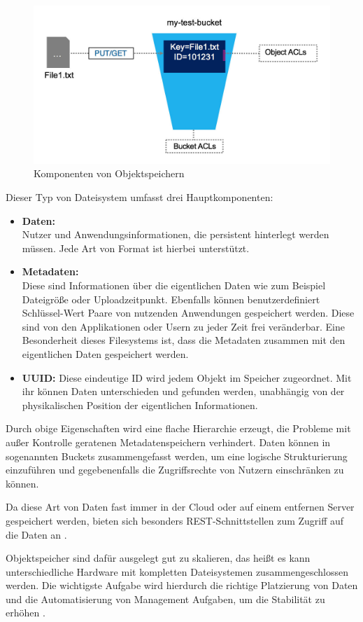\begin{figure}[hbt]
	\centering
	\includegraphics[scale=0.4]{images/object-storage}
	\caption{Komponenten von Objektspeichern \parencite[S. 5]{Rios.2017}}
	\label{fig:objectstorage}
\end{figure}

Dieser Typ von Dateisystem umfasst drei Hauptkomponenten:

\begin{itemize}
	\item \textbf{Daten:}\\
	 Nutzer und Anwendungsinformationen, die persistent hinterlegt werden müssen. Jede Art von Format ist hierbei unterstützt.
	\item \textbf{Metadaten:}\\
	 Diese sind Informationen über die eigentlichen Daten wie zum Beispiel Dateigröße oder Uploadzeitpunkt. Ebenfalls können benutzerdefiniert Schlüssel-Wert Paare von nutzenden Anwendungen gespeichert werden. Diese sind von den Applikationen oder Usern zu jeder Zeit frei veränderbar. Eine Besonderheit dieses Filesystems ist, dass die Metadaten zusammen mit den eigentlichen Daten gespeichert werden.
	\item \textbf{\ac{UUID}:} Diese eindeutige ID wird jedem Objekt im Speicher zugeordnet. Mit ihr können Daten unterschieden  und gefunden werden, unabhängig von der physikalischen Position der eigentlichen Informationen.
\end{itemize}

Durch obige Eigenschaften wird eine flache Hierarchie erzeugt, die Probleme mit außer Kontrolle geratenen Metadatenspeichern verhindert. Daten können in sogenannten Buckets zusammengefasst werden, um eine logische Strukturierung einzuführen und gegebenenfalls die Zugriffsrechte von Nutzern einschränken zu können.  

Da diese Art von Daten fast immer in der Cloud oder auf einem entfernen Server gespeichert werden, bieten sich besonders REST-Schnittstellen zum Zugriff auf die Daten an \parencite[S. 4f]{Rios.2017}.

Objektspeicher sind dafür ausgelegt gut zu skalieren, das heißt es kann unterschiedliche Hardware mit kompletten Dateisystemen zusammengeschlossen werden. Die wichtigste Aufgabe wird hierdurch die richtige Platzierung von Daten und die Automatisierung von Management Aufgaben, um die Stabilität zu erhöhen \parencite[Kap. 1, Object Storage]{varma.2015}.

